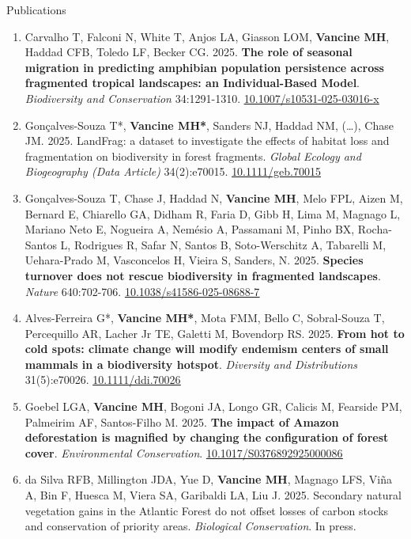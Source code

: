 \documentclass{resume}
\begin{document}
\begin{rSection}{Publications}
\begin{enumerate}
\item Carvalho T, Falconi N, White T, Anjos LA, Giasson LOM, {\bf Vancine MH}, Haddad CFB, Toledo LF, Becker CG. 2025. {\bf The role of seasonal migration in predicting amphibian population persistence across fragmented tropical landscapes: an Individual-Based Model}. {\it Biodiversity and Conservation} 34:1291-1310. \href{https://doi.org/10.1007/s10531-025-03016-x}{\underline{10.1007/s10531-025-03016-x}}

\item Gonçalves-Souza T*, {\bf Vancine MH*}, Sanders NJ, Haddad NM, (…), Chase JM. 2025. LandFrag: a dataset to investigate the effects of habitat loss and fragmentation on biodiversity in forest fragments. {\it Global Ecology and Biogeography (Data Article)} 34(2):e70015. \href{https://doi.org/10.1111/geb.70015}{\underline{10.1111/geb.70015}}

\item Gonçalves-Souza T, Chase J, Haddad N, {\bf Vancine MH}, Melo FPL, Aizen M, Bernard E, Chiarello GA, Didham R, Faria D, Gibb H, Lima M, Magnago L, Mariano Neto E, Nogueira A, Nemésio A, Passamani M, Pinho BX, Rocha-Santos L, Rodrigues R, Safar N, Santos B, Soto-Werschitz A, Tabarelli M, Uehara-Prado M, Vasconcelos H, Vieira S, Sanders, N. 2025. {\bf Species turnover does not rescue biodiversity in fragmented landscapes}. {\it Nature} 640:702-706. \href{https://doi.org/10.1038/s41586-025-08688-7}{\underline{10.1038/s41586-025-08688-7}}

\item Alves-Ferreira G*, {\bf Vancine MH*}, Mota FMM, Bello C, Sobral-Souza T, Percequillo AR, Lacher Jr TE, Galetti M, Bovendorp RS. 2025. {\bf From hot to cold spots: climate change will modify endemism centers of small mammals in a biodiversity hotspot}. {\it Diversity and Distributions} 31(5):e70026. \href{https://doi.org/10.1111/ddi.70026}{\underline{10.1111/ddi.70026}} 

\item Goebel LGA, {\bf Vancine MH}, Bogoni JA, Longo GR, Calicis M, Fearside PM, Palmeirim AF, Santos-Filho M. 2025. {\bf The impact of Amazon deforestation is magnified by changing the configuration of forest cover}. {\it Environmental Conservation}. \href{https://doi.org/10.1017/S0376892925000086}{\underline{10.1017/S0376892925000086}}

\item da Silva RFB, Millington JDA, Yue D, {\bf Vancine MH}, Magnago LFS, Viña A, Bin F, Huesca M, Viera SA, Garibaldi LA, Liu J. 2025. Secondary natural vegetation gains in the Atlantic Forest do not offset losses of carbon stocks and conservation of priority areas. {\it Biological Conservation}. In press.


\end{enumerate}
\end{rSection}
\end{document}
